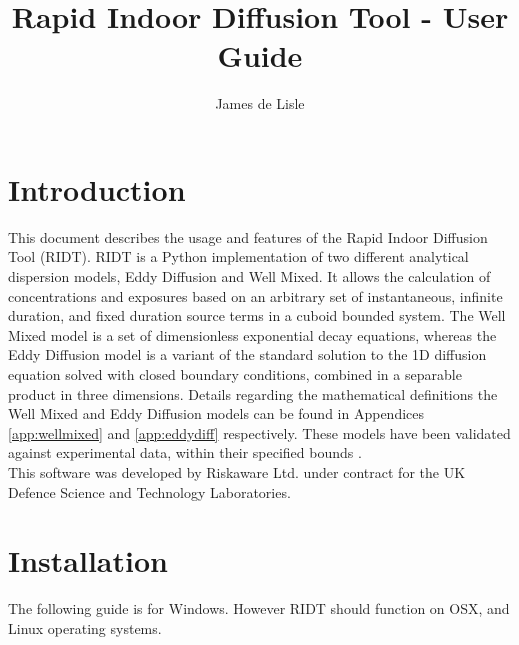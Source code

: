 \documentclass[]{article}
\title{Rapid Indoor Diffusion Tool - User Guide}
\author{James de Lisle}
\begin{document}
\maketitle

\tableofcontents

\section{Introduction}

This document describes the usage and features of the Rapid Indoor Diffusion
Tool (RIDT). RIDT is a Python implementation of two different analytical
dispersion models, Eddy Diffusion and Well Mixed. It allows the calculation of
concentrations and exposures based on an arbitrary set of instantaneous,
infinite duration, and fixed duration source terms in a cuboid bounded system.
The Well Mixed model is a set of dimensionless exponential decay equations,
whereas the Eddy Diffusion model is a variant of the standard solution to the 1D
diffusion equation solved with closed boundary conditions, combined in a
separable product in three dimensions. Details regarding the mathematical
definitions the Well Mixed and Eddy Diffusion models can be found in Appendices
\ref{app:wellmixed} and \ref{app:eddydiff} respectively. These models have been
validated against experimental data, within their specified bounds
\cite{foat20}.\\

\noindent This software was developed by Riskaware Ltd. under contract for the UK Defence
Science and Technology Laboratories.\\

\section{Installation}\label{sec:installation}

The following guide is for Windows. However RIDT should function on OSX, and
Linux operating systems.
\end{document}
